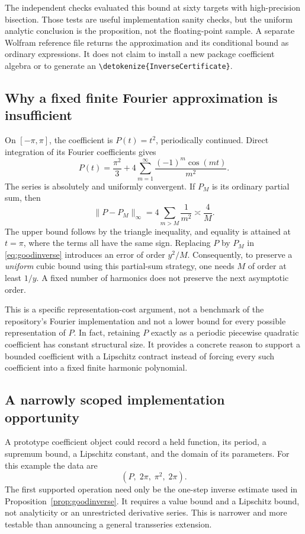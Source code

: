 \documentclass[11pt,a4paper]{article}
\newcommand{\wl}[1]{\texttt{\expandafter\nolinkurl\expandafter{\detokenize{#1}}}}
\begin{document}
The independent checks evaluated this bound at sixty targets with high-precision
bisection. Those tests are useful implementation sanity checks, but the
uniform analytic conclusion is the proposition, not the floating-point sample.
A separate Wolfram reference file returns the approximation and its conditional
bound as ordinary expressions. It does not claim to install a new package
coefficient algebra or to generate an \wl{InverseCertificate}.

\subsection{Why a fixed finite Fourier approximation is insufficient}

On $[-\pi,\pi]$, the coefficient is $P(t)=t^2$, periodically continued. Direct
integration of its Fourier coefficients gives
\begin{equation}\label{eq:fourierP}
 P(t)=\frac{\pi^2}{3}
      +4\sum_{m=1}^{\infty}\frac{(-1)^m\cos(mt)}{m^2}.
\end{equation}
The series is absolutely and uniformly convergent. If $P_M$ is its ordinary
partial sum, then
\[
 \|P-P_M\|_\infty
 =4\sum_{m>M}\frac1{m^2}\asymp\frac4M.
\]
The upper bound follows by the triangle inequality, and equality is attained
at $t=\pi$, where the terms all have the same sign. Replacing $P$ by $P_M$ in
\eqref{eq:goodinverse} introduces an error of order $y^2/M$. Consequently, to
preserve a \emph{uniform} cubic bound using this partial-sum strategy, one needs
$M$ of order at least $1/y$. A fixed number of harmonics does not preserve the
next asymptotic order.

This is a specific representation-cost argument, not a benchmark of the
repository's Fourier implementation and not a lower bound for every possible
representation of $P$. In fact, retaining $P$ exactly as a periodic piecewise
quadratic coefficient has constant structural size. It provides a concrete
reason to support a bounded coefficient with a Lipschitz contract instead of
forcing every such coefficient into a fixed finite harmonic polynomial.

\subsection{A narrowly scoped implementation opportunity}

A prototype coefficient object could record a held function, its period, a
supremum bound, a Lipschitz constant, and the domain of its parameters. For this
example the data are
\[
 (P,\;2\pi,\;\pi^2,\;2\pi).
\]
The first supported operation need only be the one-step inverse estimate used
in Proposition~\ref{prop:goodinverse}. It requires a value bound and a Lipschitz
bound, not analyticity or an unrestricted derivative series. This is narrower
and more testable than announcing a general transseries extension.
\end{document}
